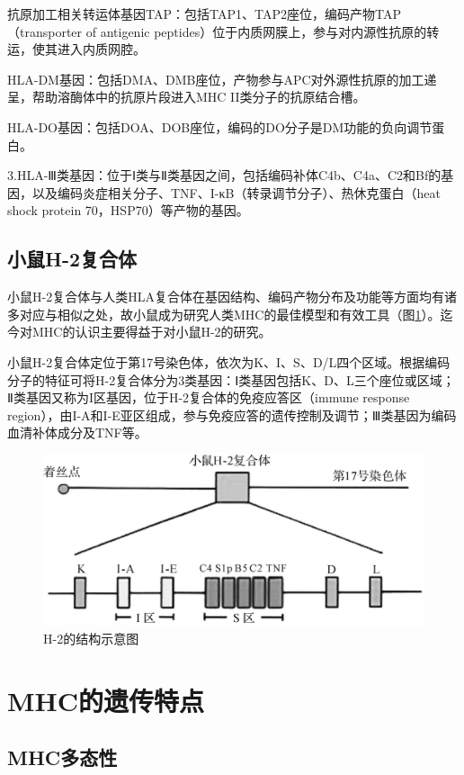 抗原加工相关转运体基因TAP：包括TAP1、TAP2座位，编码产物TAP（transporter
of antigenic
peptides）位于内质网膜上，参与对内源性抗原的转运，使其进入内质网腔。

HLA-DM基因：包括DMA、DMB座位，产物参与APC对外源性抗原的加工递呈，帮助溶酶体中的抗原片段进入MHC
II类分子的抗原结合槽。

HLA-DO基因：包括DOA、DOB座位，编码的DO分子是DM功能的负向调节蛋白。

3.HLA-Ⅲ类基因：位于Ⅰ类与Ⅱ类基因之间，包括编码补体C4b、C4a、C2和Bf的基因，以及编码炎症相关分子、TNF、I-κB（转录调节分子）、热休克蛋白（heat
shock protein 70，HSP70）等产物的基因。


\subsection{小鼠H-2复合体}

小鼠H-2复合体与人类HLA复合体在基因结构、编码产物分布及功能等方面均有诸多对应与相似之处，故小鼠成为研究人类MHC的最佳模型和有效工具（图\ref{fig7-3}）。迄今对MHC的认识主要得益于对小鼠H-2的研究。

小鼠H-2复合体定位于第17号染色体，依次为K、I、S、D/L四个区域。根据编码分子的特征可将H-2复合体分为3类基因：Ⅰ类基因包括K、D、L三个座位或区域；Ⅱ类基因又称为I区基因，位于H-2复合体的免疫应答区（immune
response
region），由I-A和I-E亚区组成，参与免疫应答的遗传控制及调节；Ⅲ类基因为编码血清补体成分及TNF等。

\begin{figure}[!htbp]
 \centering
 \includegraphics{./images/Image00104.jpg}
 \captionsetup{justification=centering}
 \caption{H-2的结构示意图}
 \label{fig7-3}
  \end{figure} 

\section{MHC的遗传特点}


\subsection{MHC多态性}

